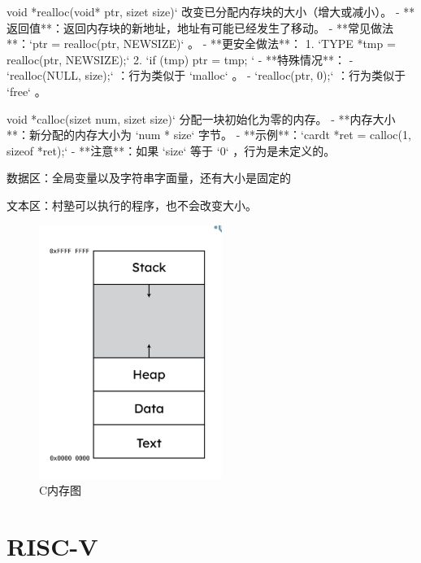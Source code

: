 \documentclass{ctexart}
\begin{document}
void *realloc(void* ptr, sizet size)`
改变已分配内存块的大小（增大或减小）。
- **返回值**：返回内存块的新地址，地址有可能已经发生了移动。
    - **常见做法**：`ptr = realloc(ptr, NEWSIZE)` 。
    - **更安全做法**：
        1. `TYPE *tmp = realloc(ptr, NEWSIZE);`
        2. `if (tmp) { ptr = tmp; }`
- **特殊情况**：
    - `realloc(NULL, size);` ：行为类似于 `malloc` 。
    - `realloc(ptr, 0);` ：行为类似于 `free` 。\par

void *calloc(sizet num, sizet size)`
分配一块初始化为零的内存。
- **内存大小**：新分配的内存大小为 `num * size` 字节。
- **示例**：`cardt *ret = calloc(1, sizeof *ret);`
- **注意**：如果 `size` 等于 `0` ，行为是未定义的。 \par
数据区：全局变量以及字符串字面量，还有大小是固定的\par
文本区：村塾可以执行的程序，也不会改变大小。
\begin{figure}
    \centering
    \includegraphics[width=0.5\linewidth]{c memory.png}
    \caption{C内存图}
    \label{fig:enter-label}
\end{figure}
\section{RISC-V}
\end{document}
